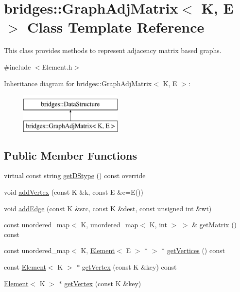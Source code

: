 \hypertarget{classbridges_1_1_graph_adj_matrix}{}\section{bridges\+:\+:Graph\+Adj\+Matrix$<$ K, E $>$ Class Template Reference}
\label{classbridges_1_1_graph_adj_matrix}


This class provides methods to represent adjacency matrix based graphs.  




{\ttfamily \#include $<$Element.\+h$>$}

Inheritance diagram for bridges\+:\+:Graph\+Adj\+Matrix$<$ K, E $>$\+:\begin{figure}[H]
\begin{center}
\leavevmode
\includegraphics[height=2.000000cm]{classbridges_1_1_graph_adj_matrix}
\end{center}
\end{figure}
\subsection*{Public Member Functions}
\begin{DoxyCompactItemize}
\item 
virtual const string \hyperlink{classbridges_1_1_graph_adj_matrix_a05a0140f4e9f1a8cfb87e68960daca7e}{get\+D\+Stype} () const  override
\item 
void \hyperlink{classbridges_1_1_graph_adj_matrix_a7d0c2f70e4030d903b4ecea2ac3b564a}{add\+Vertex} (const K \&k, const E \&e=E())
\item 
void \hyperlink{classbridges_1_1_graph_adj_matrix_a98accd921cace9f9d9cff0925aa1e3b2}{add\+Edge} (const K \&src, const K \&dest, const unsigned int \&wt)
\item 
const unordered\+\_\+map$<$ K, unordered\+\_\+map$<$ K, int $>$ $>$ \& \hyperlink{classbridges_1_1_graph_adj_matrix_a818ecb3143430c3092345c817102a7f3}{get\+Matrix} () const 
\item 
const unordered\+\_\+map$<$ K, \hyperlink{classbridges_1_1_element}{Element}$<$ E $>$ $\ast$ $>$ $\ast$ \hyperlink{classbridges_1_1_graph_adj_matrix_a10003c6781f39e1e9675e615d43237de}{get\+Vertices} () const 
\item 
const \hyperlink{classbridges_1_1_element}{Element}$<$ K $>$ $\ast$ \hyperlink{classbridges_1_1_graph_adj_matrix_acf1a2fceb3a958e4f0e0cd94b26dfcee}{get\+Vertex} (const K \&key) const 
\item 
\hyperlink{classbridges_1_1_element}{Element}$<$ K $>$ $\ast$ \hyperlink{classbridges_1_1_graph_adj_matrix_a69207aede0f932513715dd83017d6ef3}{get\+Vertex} (const K \&key)
\end{DoxyCompactItemize}


